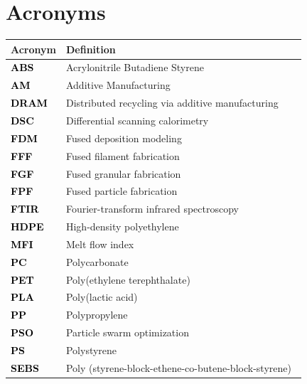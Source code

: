 \documentclass[
  letterpaper,
  DIV=11,
  numbers=noendperiod]{scrartcl}
\author{}
\date{}
\begin{document}
\ifdefined\Shaded\renewenvironment{Shaded}{\begin{tcolorbox}[interior hidden, borderline west={3pt}{0pt}{shadecolor}, sharp corners, frame hidden, enhanced, breakable, boxrule=0pt]}{\end{tcolorbox}}\fi

\section*{Acronyms}

\begingroup\fontsize{10}{12}\selectfont

\begin{tabular}{>{}ll}
\toprule
Acronym & Definition\\
\midrule
\textcolor{black}{\textbf{ABS }} & Acrylonitrile Butadiene Styrene  \\
\textcolor{black}{\textbf{AM }} & Additive Manufacturing \\
\textcolor{black}{\textbf{DRAM }} & Distributed recycling via additive manufacturing \\
\textcolor{black}{\textbf{DSC }} & Differential scanning calorimetry  \\
\textcolor{black}{\textbf{FDM }} & Fused deposition modeling \\
\textcolor{black}{\textbf{FFF }} & Fused filament fabrication \\
\textcolor{black}{\textbf{FGF }} & Fused granular fabrication \\
\textcolor{black}{\textbf{FPF }} & Fused particle fabrication \\
\textcolor{black}{\textbf{FTIR }} & Fourier-transform infrared spectroscopy  \\
\textcolor{black}{\textbf{HDPE }} & High-density polyethylene \\
\textcolor{black}{\textbf{MFI }} & Melt flow index \\
\textcolor{black}{\textbf{PC }} & Polycarbonate \\
\textcolor{black}{\textbf{PET }} & Poly(ethylene terephthalate) \\
\textcolor{black}{\textbf{PLA }} & Poly(lactic acid) \\
\textcolor{black}{\textbf{PP }} & Polypropylene  \\
\textcolor{black}{\textbf{PSO }} & Particle swarm optimization \\
\textcolor{black}{\textbf{PS }} & Polystyrene \\
\textcolor{black}{\textbf{SEBS }} & Poly (styrene-block-ethene-co-butene-block-styrene) \\

\end{tabular}
\end{document}
